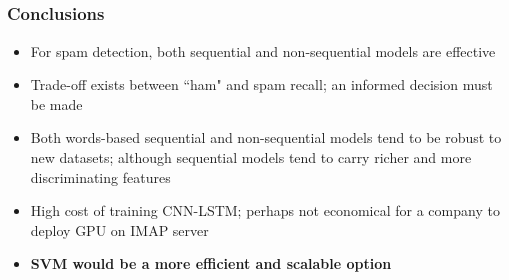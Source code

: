 \documentclass{beamer}
\begin{document}
\subsection{}
\begin{framefont}{\footnotesize}
	\begin{frame}
		\frametitle{Conclusions}
		\begin{itemize}
			\setlength\itemsep{1.2em}
			\item For spam detection, both sequential and non-sequential models are effective
			\item Trade-off exists between ``ham" and spam recall; an informed decision must be made
			\item Both words-based sequential and non-sequential models tend to be robust to new datasets; although sequential models tend to carry richer and more discriminating features
			\item High cost of training CNN-LSTM; perhaps not economical for a company to deploy GPU on IMAP server
			\item \textbf{SVM would be a more efficient and scalable option}
		\end{itemize}
	\end{frame}
\end{framefont}
\end{document}
